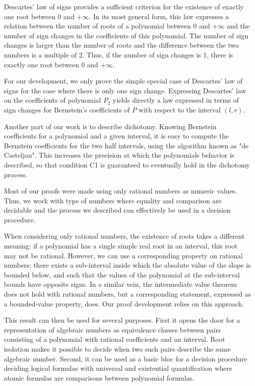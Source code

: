 \documentclass{article}
\begin{document}
Descartes' law of signs provides a sufficient criterion for the
existence of exactly one root between 0 and \(+\infty\).  In its
most general form, this law
expresses a relation between the number of roots of a polynomial
between 0 and \(+\infty\) and the number of sign changes in the
coefficients of this polynomial.  The number of sign changes is larger
than the number of roots and the difference between the two numbers is
a multiple of 2.  Thus, if the number of sign changes is 1, there is
exactly one root between 0 and \(+\infty\).

For our development, we only prove the simple special case of
Descartes' law of signs for the case where there is only one sign
change.  Expressing Descartes' law on the coefficients of polynomial
\(P_2\) yields directly a law expressed in terms of sign changes for
Bernstein's coefficients of \(P\) with respect to the interval
\((l,r)\).

Another part of our work is to describe dichotomy.  Knowing Bernstein
coefficients for a polynomial and a given interval, it is easy to
compute the Bernstein coefficients for the two half intervals, using
the algorithm known as "de Casteljau".  This increases the precision
at which the polynomials behavior is described, so that condition C1
is guaranteed to eventually hold in the dichotomy process.

Most of our proofs were made using only rational numbers as numeric
values.  Thus, we work with type of numbers where equality and
comparison are decidable and the process we described can effectively
be used in a decision procedure.

When considering only rational numbers, the existence of roots takes a
different meaning: if a polynomial has a single simple real root in an
interval, this root may not be rational.  However, we can use a
corresponding property on rational numbers: there exists a
sub-interval inside which the absolute value of the slope is bounded
below, and such that the values of the polynomial at the sub-interval
bounds have opposite signs.  In a similar vein, the intermediate value
theorem does not hold with rational numbers, but a corresponding
statement, expressed as a bounded-value property, does.  Our proof
development relies on this approach.

This result can then be used for several purposes.  First it opens the
door for a representation of algebraic numbers as equivalence classes
between pairs consisting of a polynomial with rational coefficients
and an interval.  Root isolation makes it possible to decide when two
such pairs describe the same algebraic number.  Second, it can be used
as a basic bloc for a decision procedure deciding logical formulas
with universal and existential quantification where atomic formulas
are comparisons between polynomial formulas.
\end{document}
